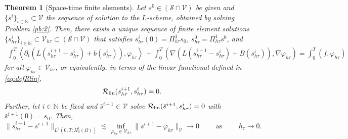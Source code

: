 \documentclass[review,11pt]{article}
\numberwithin{equation}{section}
\def \f  {\varphi}
\def \Om {\Omega}
\def \t  {\tau}
\def \N  {{\mathbb{N}}}
\def \calV {\mathcal{V}}
\def \calR {\mathcal{R}}
\def \calS {\mathcal{S}}
\newtheorem{theorem}[theorem]{Theorem}
\newtheorem{remark}[remark]{Remark}
\begin{document}
\begin{theorem}[Space-time finite elements]\label{theo:lsp}
Let $s^0\in (\calS\cap \calV)$ be given and $\{s^{i}\}_{i\in\N}\subset \calV$ the sequence of solution to the $L$-scheme, obtained by solving Problem \ref{pb:2}.   Then, there exists a unique sequence of finite element solutions $\{s_{h\t}^{i}\}_{i\in \N}\subset \mathcal V_{h\tau}\subset (\calS\cap \calV)$ that satisfies $s^i_{h\t}(0)= \Pi^1_{h\t} s_0$, $s^{0}_{h\t}= \Pi^1_{h\t} s^0$, and
  \begin{align*}
      \int_0^T \!\left\langle \partial_t \left( L(s^{i+1}_{h\t} - s^i_{h\t}) + b(s^i_{h\t}) \right), \varphi_{h\t} \right\rangle \,  
+ \int_0^T \!\left( \nabla \left( L(s^{i+1}_{h\t} - s^i_{h\t}) + B(s^i_{h\t}) \right), \nabla \varphi_{h\t} \right) 
= \int_0^T \!( f, \varphi_{h\t} )
  \end{align*}
{for all $\f_{h\t}\in \mathcal V_{h\tau}$, or equivalently, in terms of the linear functional defined in \eqref{eq:defRlin},
\begin{align}\label{eq:lsp}
\calR_{\rm lin}(s^{i+1}_{h\t},s^i_{h\t}) = 0 .
\end{align}}
Further, let $i\in \N$ be fixed and $\bar{s}^{i+1}\in \calV$ solve $\calR_{\rm lin}(\bar{s}^{i+1},s^i_{h\t})=0$ with $\bar{s}^{i+1}(0)=s_0$. Then, 
\begin{equation}\label{eq:apriori_est_lsp}
    \|s^{i+1}_{h\t}-\bar{s}^{i+1}\|_{L^2(0,T;H^1_0(\Om))}\lesssim \inf_{\f_{h\t}\in \calV_{h\t}}\|\bar{s}^{i+1}-\f_{h\t}\|_\calV \to 0 \qquad \text{ as } \qquad h_\t \to 0.
\end{equation}
\end{theorem}
\end{document}
